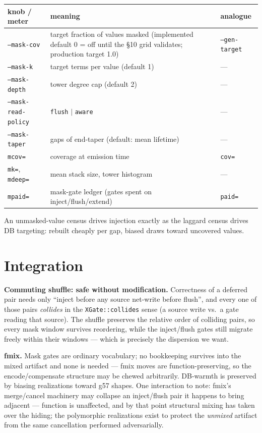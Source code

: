 \documentclass[11pt]{article}
\newcommand{\code}[1]{\texttt{#1}}
\begin{document}
\begin{center}
\small
\begin{tabular}{lll}
\toprule
knob / meter & meaning & analogue \\
\midrule
\code{--mask-cov} & target fraction of values masked (implemented default
0 = off until the \S10 grid validates; production target 1.0) &
\code{--gen-target} \\
\code{--mask-k} & target terms per value (default 1) & --- \\
\code{--mask-depth} & tower degree cap (default 2) & --- \\
\code{--mask-read-policy} & \code{flush} $|$ \code{aware} & --- \\
\code{--mask-taper} & gaps of end-taper (default: mean lifetime) & --- \\
\code{mcov=} & coverage at emission time & \code{cov=} \\
\code{mk=}, \code{mdeep=} & mean stack size, tower histogram & --- \\
\code{mpaid=} & mask-gate ledger (gates spent on inject/flush/extend) &
\code{paid=} \\
\bottomrule
\end{tabular}
\end{center}

An unmasked-value census drives injection exactly as the laggard census
drives DB targeting: rebuilt cheaply per gap, biased draws toward
uncovered values.

\section{Integration}

\textbf{Commuting shuffle: safe without modification.} Correctness of a
deferred pair needs only ``inject before any source net-write before
flush'', and every one of those pairs \emph{collides} in the
\code{XGate::collides} sense (a source write vs.\ a gate reading that
source). The shuffle preserves the relative order of colliding pairs, so
every mask window survives reordering, while the inject/flush gates still
migrate freely within their windows --- which is precisely the
dispersion we want.

\textbf{fmix.} Mask gates are ordinary vocabulary; no bookkeeping
survives into the mixed artifact and none is needed --- fmix moves are
function-preserving, so the encode/compensate structure may be chewed
arbitrarily. DB-warmth is preserved by biasing realizations toward g57
shapes. One interaction to note: fmix's merge/cancel machinery may
collapse an inject/flush pair it happens to bring adjacent --- function
is unaffected, and by that point structural mixing has taken over the
hiding; the polymorphic realizations exist to protect the \emph{unmixed}
artifact from the same cancellation performed adversarially.
\end{document}
